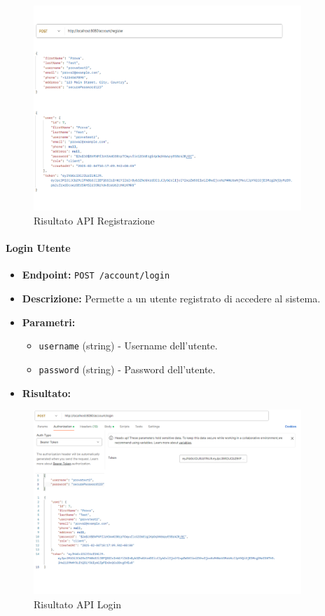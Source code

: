 \begin{figure}[h!]
    \centering
    \includegraphics[width=0.9\textwidth]{images/registerapi.png}
    \caption{Risultato API Registrazione}
    \label{fig:api_register}
\end{figure}

\paragraph{Login Utente}
\begin{itemize}
    \item \textbf{Endpoint:} \texttt{POST /account/login}
    \item \textbf{Descrizione:} Permette a un utente registrato di accedere al sistema.
    \item \textbf{Parametri:}
    \begin{itemize}
        \item \texttt{username} (string) - Username dell'utente.
        \item \texttt{password} (string) - Password dell'utente.
    \end{itemize}
    \item \textbf{Risultato:}  
\end{itemize}
\begin{figure}[h!]
    \centering
    \includegraphics[width=0.9\textwidth]{images/loginapi.png}
    \caption{Risultato API Login}
    \label{fig:api_login}
\end{figure}

